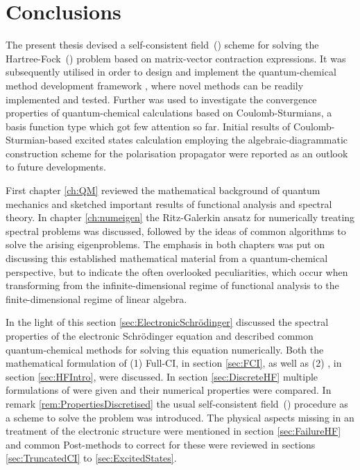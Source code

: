 \chapter{Conclusions}
\label{ch:Conclusion}

\noindent
The present thesis devised a self-consistent field~(\SCF)
scheme for solving the Hartree-Fock~(\HF) problem
based on matrix-vector contraction expressions.
It was subsequently utilised in order to design and implement the
quantum-chemical method development framework \molsturm,
where novel methods can be readily implemented and tested.
Further \molsturm was used to investigate the convergence properties
of quantum-chemical calculations
based on Coulomb-Sturmians,
a basis function type which got few attention so far.
Initial results of Coulomb-Sturmian-based excited states
calculation employing the algebraic-diagrammatic construction scheme
for the polarisation propagator were reported
as an outlook to future developments.


First chapter \ref{ch:QM} reviewed the mathematical background of quantum mechanics
and sketched important results of functional analysis
and spectral theory.
In chapter \ref{ch:numeigen} the Ritz-Galerkin ansatz
for numerically treating spectral problems
was discussed, followed by the ideas of common algorithms
to solve the arising eigenproblems.
The emphasis in both chapters
was put on discussing this established mathematical
material from a quantum-chemical perspective,
but to indicate the often overlooked peculiarities,
which occur when transforming from the infinite-dimensional regime
of functional analysis to the finite-dimensional regime of linear algebra.


In the light of this section \ref{sec:ElectronicSchrödinger}
discussed the spectral properties
of the electronic Schrödinger equation and
described common quantum-chemical methods
for solving this equation numerically.
Both the mathematical formulation of (1) Full-CI, in section \ref{sec:FCI},
as well as (2) \HF, in section \ref{sec:HFIntro}, were discussed.
In section \ref{sec:DiscreteHF} multiple formulations of \HF were given
and their numerical properties were compared.
In remark \ref{rem:PropertiesDiscretised}
the usual self-consistent field~(\SCF) procedure
as a scheme to solve the \HF problem was introduced.
The physical aspects missing in an \HF treatment of the electronic
structure were mentioned in section \ref{sec:FailureHF}
and common Post-\HF methods to correct for these were
reviewed in sections \ref{sec:TruncatedCI} to \ref{sec:ExcitedStates}.

